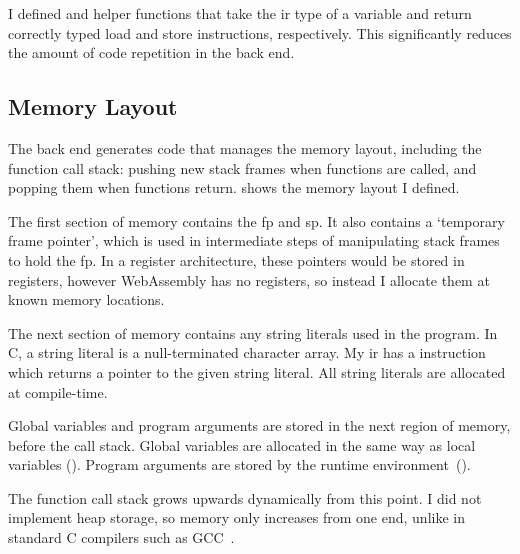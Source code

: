 \documentclass[00-main.tex]{subfiles}
\begin{document}
I defined  and  helper functions that take the \gls{ir} type of a variable and return correctly typed load and store instructions, respectively.
This significantly reduces the amount of code repetition in the back end.


\vspace{-6pt}
\subsection{Memory Layout}

The back end generates code that manages the memory layout, including the function call stack: pushing new stack frames when functions are called, and popping them when functions return.
 shows the memory layout I defined.


The first section of memory contains the \gls{fp} and \gls{sp}.
It also contains a `temporary frame pointer', which is used in intermediate steps of manipulating stack frames to hold the \gls{fp}.
In a register architecture, these pointers would be stored in registers, however WebAssembly has no registers, so instead I allocate them at known memory locations.

The next section of memory contains any string literals used in the program.
In C, a string literal is a null-terminated character array.
My \gls{ir} has a  instruction which returns a pointer to the given string literal.
All string literals are allocated at compile-time.

Global variables and program arguments are stored in the next region of memory, before the call stack.
Global variables are allocated in the same way as local variables ().
Program arguments are stored by the runtime environment~().

The function call stack grows upwards dynamically from this point.
I did not implement heap storage, so memory only increases from one end, unlike in standard C compilers such as GCC~.
\end{document}
